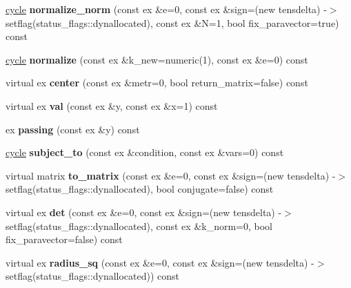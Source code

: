 \begin{DoxyCompactItemize}
\mbox{\hyperlink{class_moeb_inv_1_1cycle}{cycle}} {\bfseries normalize\+\_\+norm} (const ex \&e=0, const ex \&sign=(new tensdelta) -\/$>$setflag(status\+\_\+flags\+::dynallocated), const ex \&N=1, bool fix\+\_\+paravector=true) const
\item 
\mbox{\label{class_moeb_inv_1_1cycle_a26c62495e60365edc320e886ec8c0aab}} 
\mbox{\hyperlink{class_moeb_inv_1_1cycle}{cycle}} {\bfseries normalize} (const ex \&k\+\_\+new=numeric(1), const ex \&e=0) const
\item 
\mbox{\label{class_moeb_inv_1_1cycle_a468128d4fae6621ed299641998580615}} 
virtual ex {\bfseries center} (const ex \&metr=0, bool return\+\_\+matrix=false) const
\item 
\mbox{\label{class_moeb_inv_1_1cycle_a7ab57636de7013a28889fbe91e6fbf61}} 
virtual ex {\bfseries val} (const ex \&y, const ex \&x=1) const
\item 
\mbox{\label{class_moeb_inv_1_1cycle_a30908f9255f61cf3347d78112cdbadc4}} 
ex {\bfseries passing} (const ex \&y) const
\item 
\mbox{\label{class_moeb_inv_1_1cycle_a6bd3be5315d5a1b082befaeb5417f8c8}} 
\mbox{\hyperlink{class_moeb_inv_1_1cycle}{cycle}} {\bfseries subject\+\_\+to} (const ex \&condition, const ex \&vars=0) const
\item 
\mbox{\label{class_moeb_inv_1_1cycle_a9ec7c783b928a2a3d8bc417524598b8a}} 
virtual matrix {\bfseries to\+\_\+matrix} (const ex \&e=0, const ex \&sign=(new tensdelta) -\/$>$setflag(status\+\_\+flags\+::dynallocated), bool conjugate=false) const
\item 
\mbox{\label{class_moeb_inv_1_1cycle_a659f15d4952b0dcd013c6f21473cf24b}} 
virtual ex {\bfseries det} (const ex \&e=0, const ex \&sign=(new tensdelta) -\/$>$setflag(status\+\_\+flags\+::dynallocated), const ex \&k\+\_\+norm=0, bool fix\+\_\+paravector=false) const
\item 
\mbox{\label{class_moeb_inv_1_1cycle_ad385659a0af87a85d851a474a2d46d7c}} 
virtual ex {\bfseries radius\+\_\+sq} (const ex \&e=0, const ex \&sign=(new tensdelta) -\/$>$setflag(status\+\_\+flags\+::dynallocated)) const

\end{DoxyCompactItemize}
